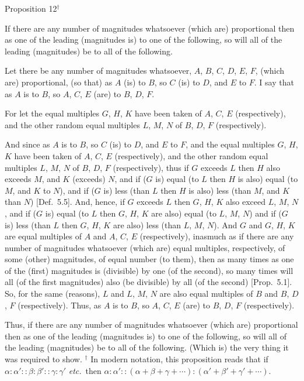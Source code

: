 
\begin{center}
{\large Proposition 12}$^\dag$
\end{center}

If there are any number  of magnitudes whatsoever
(which are) proportional then as one of the leading (magnitudes is) to one of the following, so
will 
all of the leading (magnitudes) be to all of the following.

\epsfysize=1.3in
\centerline{}

Let there be any number of magnitudes whatsoever, 
$A$, $B$, $C$, $D$, $E$, $F$, (which are) proportional, (so that) as $A$ (is) to $B$, so $C$ (is) to $D$, and 
$E$ to $F$. I say that as $A$ is to $B$, so  $A$, $C$, $E$ (are) to  $B$, $D$, $F$.

For let the equal multiples $G$, $H$,  $K$ have been taken of $A$, $C$, $E$
(respectively), and the other random equal multiples $L$, $M$,  $N$ of
$B$, $D$, $F$ (respectively).

And since as $A$ is to $B$, so $C$ (is) to $D$, and $E$ to $F$, and the equal multiples
$G$, $H$, $K$ have been taken of $A$, $C$,  $E$ (respectively), and the other
random equal multiples $L$, $M$,  $N$ of $B$, $D$,  $F$ (respectively), thus
if $G$ exceeds $L$ then $H$ also exceeds $M$, and $K$ (exceeds) $N$, and if ($G$ is)
equal (to $L$ then $H$ is also) equal (to $M$, and $K$  to $N$), and if ($G$ is) less (than $L$ then $H$ is also) less (than $M$, and $K$  than $N$)  [Def.~5.5].  And, hence, if $G$ exceeds $L$ then
$G$, $H$, $K$ also exceed $L$, $M$, $N$, and if ($G$ is) equal
(to $L$ then $G$, $H$, $K$ are also) equal (to  $L$, $M$, $N$) and if ($G$ is) less (than $L$ then
$G$, $H$, $K$ are also) less (than $L$, $M$, $N$). And $G$ and $G$, $H$, $K$ are equal multiples
of $A$ and $A$, $C$, $E$ (respectively), inasmuch as if there are any number of magnitudes whatsoever (which are)  equal multiples, respectively, of
some  (other) magnitudes,  of equal  number (to them), then as many times as one of the (first) magnitudes is (divisible) by one (of the second), so many times
will all (of the first magnitudes) also (be divisible) by all (of the second)
 [Prop.~5.1]. So, for the same (reasons), $L$
 and $L$, $M$, $N$ are also equal multiples of $B$ and $B$, $D$, $F$ (respectively). Thus,
 as $A$ is to $B$, so $A$, $C$, $E$ (are) to $B$, $D$, $F$ (respectively).
 
Thus, if there are any number  of magnitudes whatsoever
(which are) proportional then as one of the leading (magnitudes is) to one of the following, so
will 
all of the leading (magnitudes) be to all of the following. (Which is) the
very thing it was required to show.
{\footnotesize \noindent$^\dag$ In modern notation, this proposition
reads that if $\alpha:\alpha'::\beta:\beta'::\gamma:\gamma'$ {\em etc.}\ then
$\alpha:\alpha'::(\alpha+\beta+\gamma+\cdots):(\alpha'+\beta'+\gamma'+\cdots)$.}

